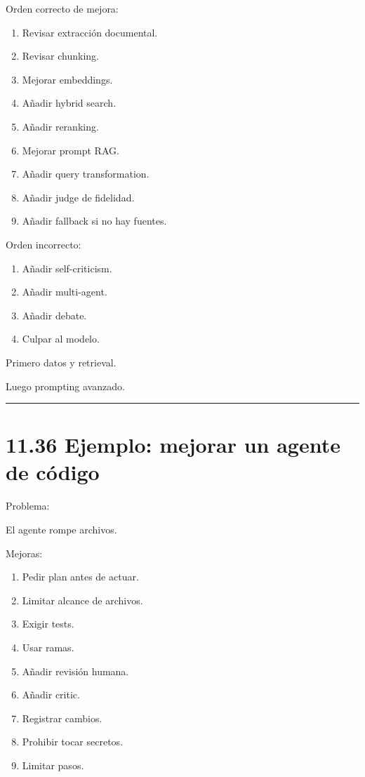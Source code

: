 Orden correcto de mejora:

\begin{enumerate}
\def\labelenumi{\arabic{enumi}.}
\tightlist
\item
  Revisar extracción documental.
\item
  Revisar chunking.
\item
  Mejorar embeddings.
\item
  Añadir hybrid search.
\item
  Añadir reranking.
\item
  Mejorar prompt RAG.
\item
  Añadir query transformation.
\item
  Añadir judge de fidelidad.
\item
  Añadir fallback si no hay fuentes.
\end{enumerate}

Orden incorrecto:

\begin{enumerate}
\def\labelenumi{\arabic{enumi}.}
\tightlist
\item
  Añadir self-criticism.
\item
  Añadir multi-agent.
\item
  Añadir debate.
\item
  Culpar al modelo.
\end{enumerate}

Primero datos y retrieval.

Luego prompting avanzado.

\begin{center}\rule{0.5\linewidth}{0.5pt}\end{center}

\section{11.36 Ejemplo: mejorar un agente de
código}\label{ejemplo-mejorar-un-agente-de-cuxf3digo}

Problema:

El agente rompe archivos.

Mejoras:

\begin{enumerate}
\def\labelenumi{\arabic{enumi}.}
\tightlist
\item
  Pedir plan antes de actuar.
\item
  Limitar alcance de archivos.
\item
  Exigir tests.
\item
  Usar ramas.
\item
  Añadir revisión humana.
\item
  Añadir critic.
\item
  Registrar cambios.
\item
  Prohibir tocar secretos.
\item
  Limitar pasos.
\end{enumerate}

